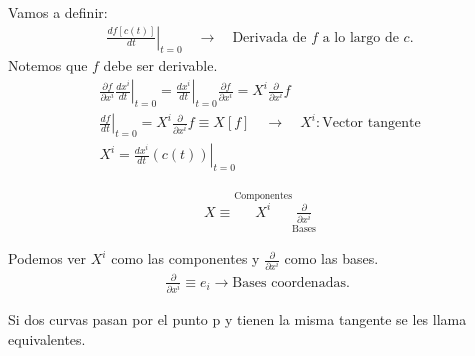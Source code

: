 \documentclass{article}
\newcommand{\caja}[3]{%
  \begin{tcolorbox}[colback=#1!5!white,colframe=#1!25!black,title=#2]
    #3
  \end{tcolorbox}%
}
\begin{document}
Vamos a definir: 
\begin{gather*}
  \left.\frac{d f[c(t)]  }{d t } \right| _{t=0 }  \quad \rightarrow \quad \text{Derivada de }f \text{ a lo largo de }c. 
\end{gather*}
Notemos que $ f  $ debe ser derivable.
\begin{gather*}
  \left.\frac{\partial f  }{\partial x^i } \frac{d x^i  }{d t} \right|_{t=0} = \left. \frac{d x^i  }{d t } \right| _{t=0 } \frac{\partial f  }{\partial x^i } = X^i \frac{\partial  }{\partial x^i } f \\
      \left. \frac{d f  }{d t }\right| _{t=0 }  = X^i \frac{\partial  }{\partial x^i }f \equiv X[f] \quad \rightarrow \quad X^i: \text{Vector tangente}\\
  X^i = \left.\frac{d x^i  }{d t }(c(t)) \right| _{t=0 } 
\end{gather*}
\caja{red}{}{
  \begin{gather*}
    X \equiv \overset{\text{Componentes}}{X ^ {i }} \underset{\text{Bases}}{\frac{\partial  }{\partial x^i}}
  \end{gather*}
}
Podemos ver $ X^i  $ como las componentes y $ \frac{\partial  }{\partial x^i } $ como las bases.
\begin{gather*}
  \frac{\partial  }{\partial x^i } \equiv e_i \rightarrow \text{Bases coordenadas. } 
\end{gather*}

Si dos curvas pasan por el punto p y tienen la misma tangente se les llama equivalentes.
\end{document}
